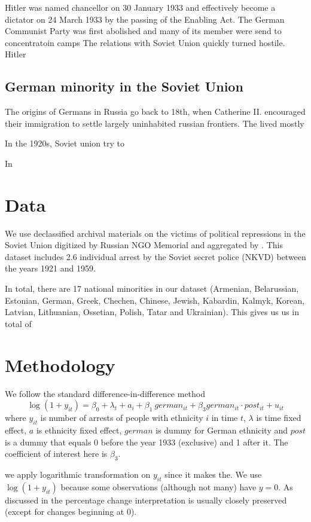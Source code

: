 \documentclass[12pt]{article}
\begin{document}
Hitler was named chancellor on 30 January 1933 and effectively become a dictator on 24 March 1933 by the passing of the Enabling Act. The German Communist Party was first abolished and many of its member were send to concentratoin camps
The relations with Soviet Union quickly turned hostile. Hitler 

\subsection{German minority in the Soviet Union}
The origins of Germans in Russia go back to 18th, when Catherine II. encouraged their immigration to settle largely uninhabited russian frontiers. The lived mostly 

In the 1920s, Soviet union try to 

In 
\section{Data}
We use declassified archival materials on the victims of political repressions in the Soviet Union digitized by Russian NGO Memorial and aggregated by \citet{zhukov_stalins_2018}. This dataset includes 2.6 individual arrest by the Soviet secret police (NKVD) between  the years 1921 and 1959.

In total, there are 17 national minorities in our dataset (Armenian, Belarussian, Estonian, German, Greek, Chechen, Chinese, Jewish, Kabardin, Kalmyk, Korean, Latvian, Lithuanian, Ossetian, Polish, Tatar and Ukrainian). This gives us us in total of 


\section{Methodology}
We follow the standard difference-in-difference method
$$ \log\left(1 + y_{it}\right) = \beta_0 +\lambda_t + a_i + \beta_1 \: german_{it} + \beta_3 german_{it} \cdot post_{it} + u_{it} $$
where $y_{it}$ is number of arrests of people with ethnicity $i$ in time $t$, $\lambda$ is time fixed effect, $a$ is ethnicity fixed effect, $german$ is dummy for German ethnicity and $post$ is a dummy that equals 0 before the year 1933 (exclusive) and 1 after it. The coefficient of interest here is $\beta_3$. 

 we apply logarithmic transformation on $y_{it}$ since it makes the.  We use $\log\left(1 + y_{it}\right)$ because some observations (although not many) have $y = 0$. As discussed in \citet[p. 193]{wooldridge_introductory_2015}  the percentage change interpretation is usually  closely preserved (except for changes beginning at 0).   
\end{document}
